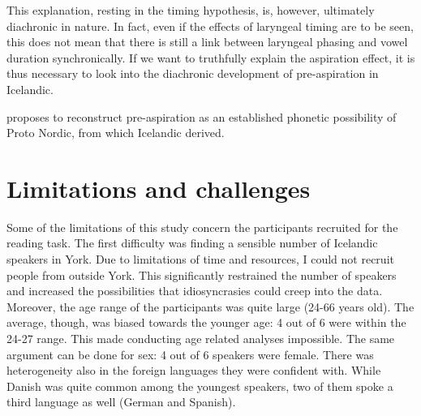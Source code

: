 \documentclass[11pt,a4paper,openany]{memoir}\usepackage[]{graphicx}\usepackage[]{color}
\begin{document}
This explanation, resting in the timing hypothesis, is, however, ultimately diachronic in nature.
In fact, even if the effects of laryngeal timing are to be seen, this does not mean that there is still a link between laryngeal phasing and vowel duration synchronically.
If we want to truthfully explain the aspiration effect, it is thus necessary to look into the diachronic development of pre-aspiration in Icelandic.

\citet{helgason2002} proposes to reconstruct pre-aspiration as an established phonetic possibility of Proto Nordic, from which Icelandic derived.


\section{Limitations and challenges}

Some of the limitations of this study concern the participants recruited for the reading task.
The first difficulty was finding a sensible number of Icelandic speakers in York.
Due to limitations of time and resources, I could not recruit people from outside York.
This significantly restrained the number of speakers and increased the possibilities that idiosyncrasies could creep into the data.
Moreover, the age range of the participants was quite large (24-66 years old).
The average, though, was biased towards the younger age: 4 out of 6 were within the 24-27 range.
This made conducting age related analyses impossible.
The same argument can be done for sex: 4 out of 6 speakers were female.
There was heterogeneity also in the foreign languages they were confident with.
While Danish was quite common among the youngest speakers, two of them spoke a third language as well (German and Spanish).
\end{document}
